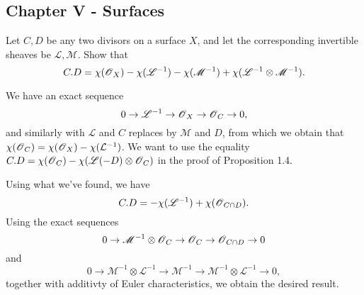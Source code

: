 \documentclass[11pt, english]{article}
\begin{document}
\subsection{Chapter V - Surfaces}

\begin{exc}[Exercise 1.1]
Let $C,D$ be any two divisors on a surface $X$, and let the corresponding invertible sheaves be $\mathscr L, \mathscr M$. Show that
\[
C.D = \chi(\operatorname{\mathscr{O}}_X) -\chi(\mathscr L^{-1})-\chi(\mathscr M^{-1})+\chi(\mathscr L^{-1} \otimes \mathscr M^{-1}).
\]
\end{exc}

\begin{sol}
We have an exact sequence
\[
0 \to \mathscr L^{-1} \to \operatorname{\mathscr{O}}_X \to \operatorname{\mathscr{O}}_C \to 0,
\]
and similarly with $\mathscr L$ and $C$ replaces by $\mathscr M$ and  $D$, from which we obtain that $\chi(\operatorname{\mathscr{O}}_C) = \chi(\operatorname{\mathscr{O}}_X)-\chi(\mathcal{L}^{-1})$. We want to use the equality $C.D = \chi(\operatorname{\mathscr{O}}_C)- \chi(\mathscr L(-D) \otimes \operatorname{\mathscr{O}}_C)$ in the proof of Proposition 1.4.

Using what we've found, we have
$$
C.D = -\chi(\mathscr L^{-1}) + \chi ( \operatorname{\mathscr{O}}_{C \cap D}).
$$
Using the exact sequences 
\[
0 \to \mathscr M^{-1} \otimes \operatorname{\mathscr{O}}_C \to \operatorname{\mathscr{O}}_C \to \operatorname{\mathscr{O}}_{C \cap D} \to 0
\]
and 
\[
0 \to \mathscr M^{-1} \otimes \mathscr L^{-1} \to \mathscr M^{-1} \to \mathscr M^{-1} \otimes \mathscr L^{-1} \to 0,
\]
together with additivty of Euler characteristics, we obtain the desired result.
\end{sol}
\end{document}
